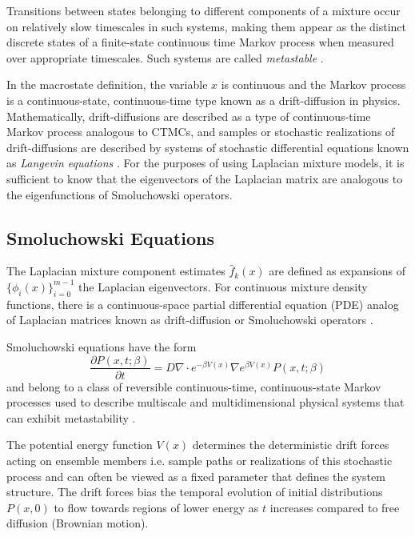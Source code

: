 \documentclass[10pt,letterpaper]{article}
\begin{document}
Transitions between states belonging to different components of a mixture occur on relatively slow timescales in such systems, making them appear as the distinct discrete states of a finite-state continuous time Markov process when measured over appropriate timescales.
Such systems are called \emph{metastable} \cite{risken, shall96}.

In the macrostate definition, the variable $x$ is continuous and the Markov process is a continuous-state, continuous-time type known as a drift-diffusion in physics.
Mathematically, drift-diffusions are described as a type of continuous-time Markov process analogous to CTMCs, and samples or stochastic realizations of drift-diffusions are described by systems of stochastic differential equations known as \emph{Langevin equations} \cite{risken}.
For the purposes of using Laplacian mixture models, it is sufficient to know that the eigenvectors of the Laplacian matrix are analogous to the eigenfunctions of Smoluchowski operators.
\subsection*{Smoluchowski Equations}
The Laplacian mixture component estimates $\hat f_k(x)$ are defined as expansions of $\{\phi_i(x)\}_{i = 0}^{m - 1}$ the Laplacian eigenvectors.
For continuous mixture density functions, there is a continuous-space partial differential equation (PDE) analog of Laplacian matrices known as drift-diffusion or Smoluchowski operators \cite{risken}.


Smoluchowski equations have the form
\begin{equation}
\frac{\partial P(x, t; \beta)}{\partial t} = D \nabla \cdot e^{-\beta V(x)} \nabla e^{\beta V(x)} P(x, t; \beta)\label{eq:smol} %
\end{equation}
and belong to a class of reversible continuous-time, continuous-state Markov processes used to describe multiscale and multidimensional physical systems that can exhibit metastability \cite{risken}.


The potential energy function $V(x)$ determines the deterministic drift forces acting on ensemble members i.e. sample paths or realizations of this stochastic process and can often be viewed as a fixed parameter that defines the system structure.
The drift forces bias the temporal evolution of initial distributions $P(x, 0)$ to flow towards regions of lower energy as $t$ increases compared to free diffusion (Brownian motion).
\end{document}
